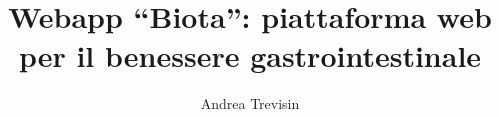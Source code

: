 \title{Webapp ``Biota'': piattaforma web per il benessere gastrointestinale}
\author{Andrea Trevisin}


